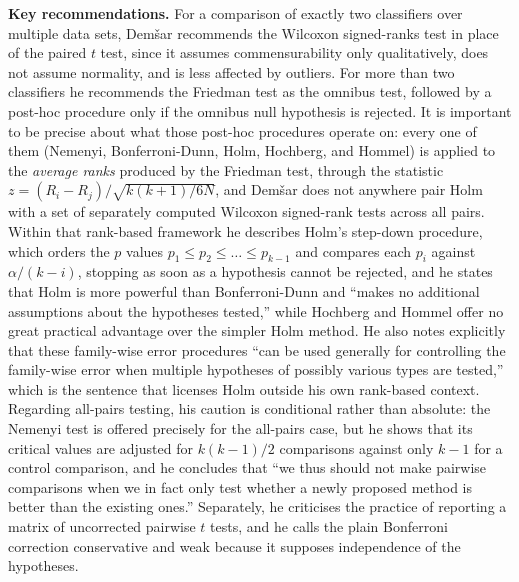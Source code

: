 \documentclass[11pt, a4paper]{article}
\begin{document}
\textbf{Key recommendations.} For a comparison of exactly two classifiers over multiple data sets, Dem\v{s}ar recommends the Wilcoxon signed-ranks test in place of the paired $t$ test, since it assumes commensurability only qualitatively, does not assume normality, and is less affected by outliers. For more than two classifiers he recommends the Friedman test as the omnibus test, followed by a post-hoc procedure only if the omnibus null hypothesis is rejected. It is important to be precise about what those post-hoc procedures operate on: every one of them (Nemenyi, Bonferroni-Dunn, Holm, Hochberg, and Hommel) is applied to the \emph{average ranks} produced by the Friedman test, through the statistic $z = (R_i - R_j) / \sqrt{k(k+1)/6N}$, and Dem\v{s}ar does not anywhere pair Holm with a set of separately computed Wilcoxon signed-rank tests across all pairs. Within that rank-based framework he describes Holm's step-down procedure, which orders the $p$ values $p_1 \leq p_2 \leq \ldots \leq p_{k-1}$ and compares each $p_i$ against $\alpha/(k-i)$, stopping as soon as a hypothesis cannot be rejected, and he states that Holm is more powerful than Bonferroni-Dunn and ``makes no additional assumptions about the hypotheses tested,'' while Hochberg and Hommel offer no great practical advantage over the simpler Holm method. He also notes explicitly that these family-wise error procedures ``can be used generally for controlling the family-wise error when multiple hypotheses of possibly various types are tested,'' which is the sentence that licenses Holm outside his own rank-based context. Regarding all-pairs testing, his caution is conditional rather than absolute: the Nemenyi test is offered precisely for the all-pairs case, but he shows that its critical values are adjusted for $k(k-1)/2$ comparisons against only $k-1$ for a control comparison, and he concludes that ``we thus should not make pairwise comparisons when we in fact only test whether a newly proposed method is better than the existing ones.'' Separately, he criticises the practice of reporting a matrix of uncorrected pairwise $t$ tests, and he calls the plain Bonferroni correction conservative and weak because it supposes independence of the hypotheses.
\end{document}
